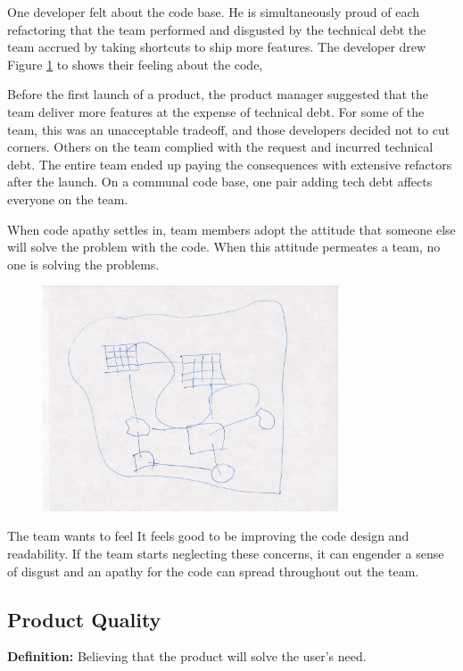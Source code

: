 One developer felt  about the code base. He is simultaneously proud of each refactoring that the team performed and disgusted by the technical debt the team accrued by taking shortcuts to ship more features. The developer drew Figure \ref{Programmer1} to shows their feeling about the code, 

Before the first launch of a product, the product manager suggested that the team deliver more features at the expense of technical debt. For some of the team, this was an unacceptable tradeoff, and those developers decided not to cut corners. Others on the team complied with the request and incurred technical debt. The entire team ended up paying the consequences with extensive refactors after the launch. On a communal code base, one pair adding tech debt affects everyone on the team.

When code apathy settles in, team members adopt the attitude that someone else will solve the problem with the code. When this attitude permeates a team, no one is solving the problems. 

\begin{figure}[t]
\centering
\includegraphics[width=3.45in]{CodeOwnership.jpg}
\caption{}
\label{Programmer1}
\end{figure}


The team wants to feel   It feels good to be improving the code design and readability. If the team starts neglecting these concerns, it can engender a sense of disgust and an apathy for the code can spread throughout out the team.


\subsection{Product Quality}
\textbf{Definition:} Believing that the product will solve the user’s need.

